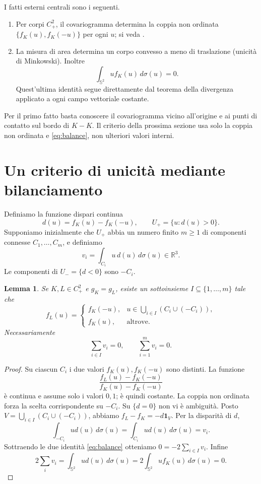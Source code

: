 \documentclass[11pt,a4paper]{article}
\newtheorem{lemma}[theorem]{Lemma}
\theoremstyle{remark}
\newcommand{\R}{\mathbb R}
\newcommand{\Sph}{\mathbb S^2}
\newcommand{\ind}{\mathbf 1}
\begin{document}
I fatti esterni centrali sono i seguenti.
\begin{enumerate}
\item Per corpi $C^2_+$, il covariogramma determina la coppia non ordinata
      $\{f_K(u),f_K(-u)\}$ per ogni $u$; si veda \cite[Proposizione 3.1]{B16}.
\item La misura di area determina un corpo convesso a meno di traslazione
      (unicità di Minkowski). Inoltre
      \begin{equation}\label{eq:balance}
      \int_{\Sph}u f_K(u)\,d\sigma(u)=0.
      \end{equation}
      Quest'ultima identità segue direttamente dal teorema della divergenza
      applicato a ogni campo vettoriale costante.
\end{enumerate}
Per il primo fatto basta conoscere il covariogramma vicino all'origine e ai
punti di contatto sul bordo di $K-K$. Il criterio della prossima sezione usa
solo la coppia non ordinata e \eqref{eq:balance}, non ulteriori valori interni.

\section{Un criterio di unicità mediante bilanciamento}
Definiamo la funzione dispari continua
\[
d(u)=f_K(u)-f_K(-u),\qquad U_+=\{u:d(u)>0\}.
\]
Supponiamo inizialmente che $U_+$ abbia un numero finito $m\geq1$ di
componenti connesse $C_1,\ldots,C_m$, e definiamo
\begin{equation}\label{eq:vi}
v_i=\int_{C_i}u\,d(u)\,d\sigma(u)\in\R^3.
\end{equation}
Le componenti di $U_-=\{d<0\}$ sono $-C_i$.

\begin{lemma}\label{lem:selection}
Se $K,L\in C^2_+$ e $g_K=g_L$, esiste un sottoinsieme
$I\subseteq\{1,\ldots,m\}$ tale che
\[
f_L(u)=
\begin{cases}
f_K(-u),&u\in\displaystyle\bigcup_{i\in I}(C_i\cup(-C_i)),\\
f_K(u),&\text{altrove}.
\end{cases}
\]
Necessariamente
\begin{equation}\label{eq:zerosum}
\sum_{i\in I}v_i=0,\qquad \sum_{i=1}^m v_i=0.
\end{equation}
\end{lemma}
\begin{proof}
Su ciascun $C_i$ i due valori $f_K(u),f_K(-u)$ sono distinti. La funzione
\[
\frac{f_L(u)-f_K(-u)}{f_K(u)-f_K(-u)}
\]
è continua e assume solo i valori $0,1$; è quindi costante. La coppia non
ordinata forza la scelta corrispondente su $-C_i$. Su $\{d=0\}$ non vi è
ambiguità. Posto $V=\bigcup_{i\in I}(C_i\cup(-C_i))$, abbiamo
$f_L-f_K=-d\ind_V$. Per la disparità di $d$,
\[
\int_{-C_i}u d(u)\,d\sigma(u)=\int_{C_i}u d(u)\,d\sigma(u)=v_i.
\]
Sottraendo le due identità \eqref{eq:balance} otteniamo
$0=-2\sum_{i\in I}v_i$. Infine
\[
2\sum_i v_i=\int_{\Sph}u d(u)\,d\sigma(u)
=2\int_{\Sph}u f_K(u)\,d\sigma(u)=0.
\]
\end{proof}
\end{document}
